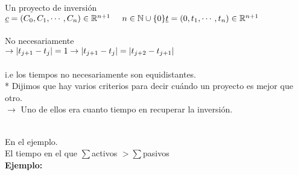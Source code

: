\begin{definition}
Un proyecto de inversión\\
$\underline{c} = (C_0,C_1,\cdots, C_n) \in \mathbb{R}^{n+1}\phantom{abc} n\in \mathbb{N}\cup\{0\} \\
\underline{t} = (0,t_1,\cdots, t_n) \in \mathbb{R}^{n+1}$\\ \\
No necesariamente\\
$\rightarrow |t_{j+1} - t_j | = 1 \\
\rightarrow |t_{j+1} - t_j | = |t_{j+2} - t_{j+1} |$\\ \\
i.e los tiempos no necesariamente son equidistantes. \\
* Dijimos que hay varios criterios para decir cuándo un proyecto es mejor que otro.\\
$\rightarrow$ Uno de ellos era cuanto tiempo en recuperar la inversión.\\ \\
\end{definition}
En el ejemplo. \\
El tiempo en el que $\sum$activos $> \sum$pasivos \\
\textbf{Ejemplo:}
